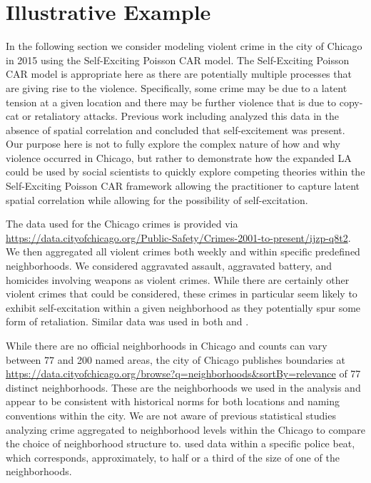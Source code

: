 \documentclass[11pt]{isuthesis}
\begin{document}
	\section{Illustrative Example}
	
	In the following section we consider modeling violent crime in the city of Chicago in 2015 using the Self-Exciting Poisson CAR model.  The Self-Exciting Poisson CAR model is appropriate here as there are potentially multiple processes that are giving rise to the violence.  Specifically, some crime may be due to a latent tension at a given location and there may be further violence that is due to copy-cat or retaliatory attacks.  Previous work including \cite{mohler2013modeling} analyzed this data in the absence of spatial correlation and concluded that self-excitement was present.  Our purpose here is not to fully explore the complex nature of how and why violence occurred in Chicago, but rather to demonstrate how the expanded LA could be used by social scientists to quickly explore competing theories within the Self-Exciting Poisson CAR framework allowing the practitioner to capture latent spatial correlation while allowing for the possibility of self-excitation.
	
	The data used for the Chicago crimes is provided via \url{https://data.cityofchicago.org/Public-Safety/Crimes-2001-to-present/ijzp-q8t2}.  We then aggregated all violent crimes both weekly and within specific predefined neighborhoods.  We considered aggravated assault, aggravated battery, and homicides involving weapons as violent crimes.  While there are certainly other violent crimes that could be considered, these crimes in particular seem likely to exhibit self-excitation within a given neighborhood as they potentially spur some form of retaliation.  Similar data was used in both \cite{mohler2013modeling} and \cite{mohler2014marked}. 
	
	While there are no official neighborhoods in Chicago and counts can vary between 77 and 200 named areas, the city of Chicago publishes boundaries at \url{https://data.cityofchicago.org/browse?q=neighborhoods&sortBy=relevance} of 77 distinct neighborhoods.  These are the neighborhoods we used in the analysis and appear to be consistent with historical norms for both locations and naming conventions within the city.  We are not aware of previous statistical studies analyzing crime aggregated to neighborhood levels within the Chicago to compare the choice of neighborhood structure to.  \cite{mohler2013modeling} used data within a specific police beat, which corresponds, approximately, to half or a third of the size of one of the neighborhoods.
	
\end{document}

